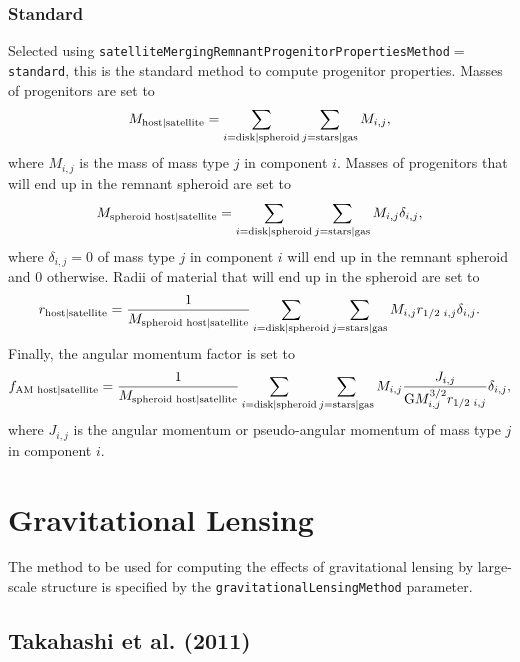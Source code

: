 \subsubsection{Standard}

Selected using {\tt satelliteMergingRemnantProgenitorPropertiesMethod}$=${\tt standard}, this is the standard method to compute progenitor properties. Masses of progenitors are set to
\begin{equation}
 M_{\rm host|satellite} = \sum_{i={\rm disk|spheroid}} \sum_{j={\rm stars|gas}} M_{i,j},
\end{equation}
where $M_{i,j}$ is the mass of mass type $j$ in \gls{component} $i$. Masses of progenitors that will end up in the remnant spheroid are set to
\begin{equation}
 M_{\rm spheroid\,\,host|satellite} = \sum_{i={\rm disk|spheroid}} \sum_{j={\rm stars|gas}} M_{i,j} \delta_{i,j},
\end{equation}
where $\delta_{i,j}=0$ of mass type $j$ in \gls{component} $i$ will end up in the remnant spheroid and $0$ otherwise. Radii of material that will end up in the spheroid are set to
\begin{equation}
 r_{\rm host|satellite} = {1 \over M_{\rm spheroid\,\,host|satellite}} \sum_{i={\rm disk|spheroid}} \sum_{j={\rm stars|gas}} M_{i,j} r_{1/2\,\,i,j} \delta_{i,j}.
\end{equation}
Finally, the angular momentum factor is set to
\begin{equation}
 f_{\rm AM\,\,host|satellite} = {1 \over M_{\rm spheroid\,\,host|satellite}} \sum_{i={\rm disk|spheroid}} \sum_{j={\rm stars|gas}} M_{i,j} {J_{i,j} \over {\rm G} M^{3/2}_{i,j} r_{1/2\,\,i,j}} \delta_{i,j},
\end{equation}
where $J_{i,j}$ is the angular momentum or pseudo-angular momentum of mass type $j$ in \gls{component} $i$.

\section{Gravitational Lensing}\label{phys:gravitationalLensing}

The method to be used for computing the effects of gravitational lensing by large-scale structure is specified by the {\tt gravitationalLensingMethod} parameter.

\subsection{Takahashi et al. (2011)}\label{phys:gravitationalLensing:gravitationalLensingTakahashi2011}

